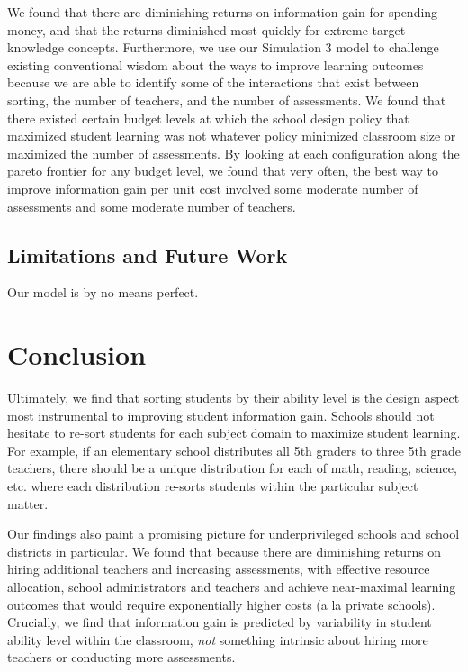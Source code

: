 \documentclass[10pt, letterpaper]{apa6}
\begin{document}
We found that there are diminishing returns on information gain for
spending money, and that the returns diminished most quickly for extreme
target knowledge concepts. Furthermore, we use our Simulation 3 model to
challenge existing conventional wisdom about the ways to improve
learning outcomes because we are able to identify some of the
interactions that exist between sorting, the number of teachers, and the
number of assessments. We found that there existed certain budget levels
at which the school design policy that maximized student learning was
not whatever policy minimized classroom size or maximized the number of
assessments. By looking at each configuration along the pareto frontier
for any budget level, we found that very often, the best way to improve
information gain per unit cost involved some moderate number of
assessments and some moderate number of teachers.

\subsection{Limitations and Future
Work}\label{limitations-and-future-work}

Our model is by no means perfect.

\section{Conclusion}\label{conclusion}

Ultimately, we find that sorting students by their ability level is the
design aspect most instrumental to improving student information gain.
Schools should not hesitate to re-sort students for each subject domain
to maximize student learning. For example, if an elementary school
distributes all 5th graders to three 5th grade teachers, there should be
a unique distribution for each of math, reading, science, etc. where
each distribution re-sorts students within the particular subject
matter.

Our findings also paint a promising picture for underprivileged schools
and school districts in particular. We found that because there are
diminishing returns on hiring additional teachers and increasing
assessments, with effective resource allocation, school administrators
and teachers and achieve near-maximal learning outcomes that would
require exponentially higher costs (a la private schools). Crucially, we
find that information gain is predicted by variability in student
ability level within the classroom, \emph{not} something intrinsic about
hiring more teachers or conducting more assessments.
\end{document}
